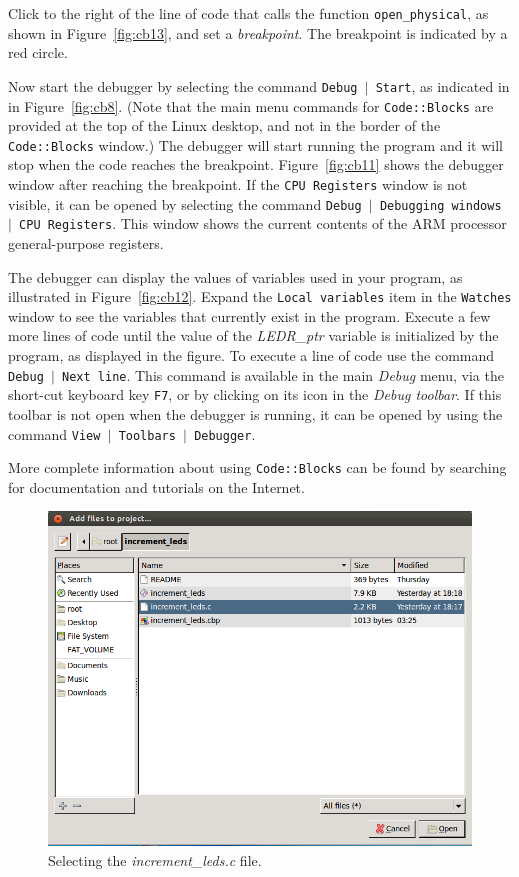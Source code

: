 \documentclass[11pt, twoside, pdftex]{article}
\begin{document}
\clearpage
\newpage
Click to the right of the line of code that calls the function
\texttt{open\_physical}, as shown in Figure~\ref{fig:cb13},
and set a {\it breakpoint}. The breakpoint is indicated by a red circle. 

Now start the debugger by selecting the command \texttt{Debug $\mid$ Start}, as indicated in 
in Figure~\ref{fig:cb8}. (Note that the main menu commands for \texttt{Code::Blocks} are
provided at the top of the Linux desktop, and not in the border of the
\texttt{Code::Blocks} window.) The debugger will start running the program and it will
stop when the code reaches the breakpoint. Figure~\ref{fig:cb11} shows the debugger window
after reaching the breakpoint. If the \texttt{CPU Registers} window is not visible, it can
be opened by selecting the command \texttt{Debug $\mid$ Debugging windows $\mid$ CPU
Registers}. This window shows the current contents of the ARM processor general-purpose registers.

The debugger can display the values of variables used in your program, as
illustrated in Figure~\ref{fig:cb12}. Expand the \texttt{Local variables} item in the
\texttt{Watches} window to see the variables that currently exist in the program.
Execute a few more lines of code until the value of the {\it LEDR\_ptr} variable is initialized
by the program, as displayed in the figure. To execute a line of code use the command
\texttt{Debug $\mid$ Next line}. This command is available in the main {\it Debug}
menu, via the short-cut keyboard key \texttt{F7}, or by clicking on its icon in the
{\it Debug toolbar}. If this toolbar is not open when the debugger is running, it can be
opened by using the command \texttt{View $\mid$ Toolbars $\mid$ Debugger}.

More complete information about using \texttt{Code::Blocks} can be found by searching
for documentation and tutorials on the Internet.
~\\
\begin{figure} [h]
\begin{center}
\includegraphics[scale = .60]{figures/cb6.png}
\end{center}
\caption{Selecting the {\it increment\_leds.c} file.}
\label{fig:cb6}
\end{figure}
\end{document}
